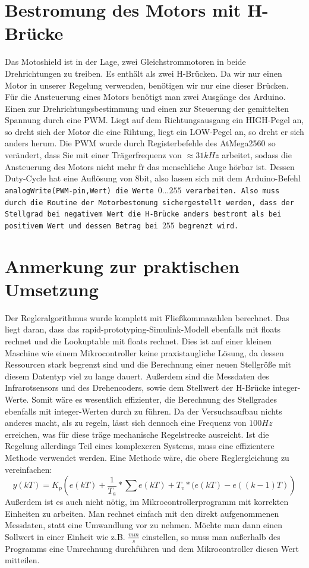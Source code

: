 \documentclass[a4paper]{report}
\begin{document}
\section{Bestromung des Motors mit H-Br\"ucke}
Das Motoshield ist in der Lage, zwei Gleichstrommotoren in beide Drehrichtungen zu treiben. Es enth\"alt als zwei H-Br\"ucken. Da wir nur einen Motor in unserer Regelung verwenden, ben\"otigen wir nur eine dieser Br\"ucken. F\"ur die Ansteuerung eines Motors ben\"otigt man zwei Ausg\"ange des Arduino. Einen zur Drehrichtungsbestimmung und einen zur Steuerung der gemittelten Spannung durch eine PWM. Liegt auf dem Richtungsausgang ein HIGH-Pegel an, so dreht sich der Motor die eine Rihtung, liegt ein LOW-Pegel an, so dreht er sich anders herum. Die PWM wurde durch Registerbefehle des AtMega2560 so ver\"andert, dass Sie mit einer Tr\"agerfrequenz von $\approx 31kHz$ arbeitet, sodass die Ansteuerung des Motors nicht mehr f\"r das menschliche Auge h\"orbar ist. Dessen Duty-Cycle hat eine Aufl\"osung von 8bit, also  lassen sich mit dem Arduino-Befehl \tt analogWrite(PWM-pin,Wert) \rm die Werte $0...255$ verarbeiten. Also muss durch die Routine der Motorbestomung sichergestellt werden, dass der Stellgrad bei negativem Wert die H-Br\"ucke anders bestromt als bei positivem Wert und dessen Betrag bei $255$ begrenzt wird.

\section{Anmerkung zur praktischen Umsetzung}
Der Regleralgorithmus wurde komplett mit Flie{\ss}kommazahlen berechnet. Das liegt daran, dass das rapid-prototyping-Simulink-Modell ebenfalls mit floats rechnet und  die Lookuptable mit floats rechnet. Dies ist auf einer kleinen Maschine wie einem Mikrocontroller keine praxistaugliche L\"osung, da dessen Ressourcen stark begrenzt sind und die Berechnung einer neuen Stellgr\"o{\ss}e mit diesem Datentyp viel zu lange dauert. Au{\ss}erdem sind die Messdaten des Infrarotsensors und des Drehencoders, sowie dem Stellwert der H-Br\"ucke integer-Werte. Somit w\"are es wesentlich effizienter, die Berechnung des Stellgrades ebenfalls mit integer-Werten durch zu f\"uhren. Da der Versuchsaufbau nichts anderes macht, als zu regeln, l\"asst sich dennoch eine Frequenz von $100Hz$ erreichen, was f\"ur diese tr\"age mechanische Regelstrecke ausreicht. Ist die Regelung allerdings Teil eines komplexeren Systems, muss eine effizientere Methode verwendet werden. Eine Methode w\"are, die obere Reglergleichung zu vereinfachen:
\[ y(kT)=K_p\left(e(kT)+\frac{1}{T_a}*\sum e(kT)  +T_v*(e(kT)-e((k-1)T)\right)\]
Au{\ss}erdem ist es auch nicht n\"otig, im Mikrocontrollerprogramm mit korrekten Einheiten zu arbeiten. Man rechnet einfach mit den direkt aufgenommenen Messdaten, statt eine Umwandlung vor zu nehmen. M\"ochte man dann einen Sollwert in einer Einheit wie z.B. $\frac{mm}{s}$ einstellen, so muss man au{\ss}erhalb des Programms eine Umrechnung durchf\"uhren und dem Mikrocontroller diesen Wert mitteilen.
\end{document}
